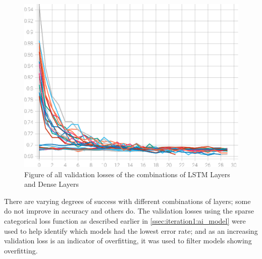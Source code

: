\begin{figure}[ht]
    \centering
    \includegraphics[width=0.95\columnwidth]{figures/results/lstm_iteration1_all_loss.eps}
    \caption[Figure of accuracies and losses for Iteration 1]{Figure of all validation losses of the combinations of LSTM Layers and Dense Layers}
    \label{fig:iteration1_all_loss}
\end{figure}
\FloatBarrier

There are varying degrees of success with different combinations of layers; some do not improve in accuracy and others do.
The validation losses using the sparse categorical loss function as described earlier in \autoref{ssec:iteration1:ai_model}
were used to help identify which models had the lowest error rate; and as an increasing validation
loss is an indicator of overfitting, it was used to filter models showing overfitting.


